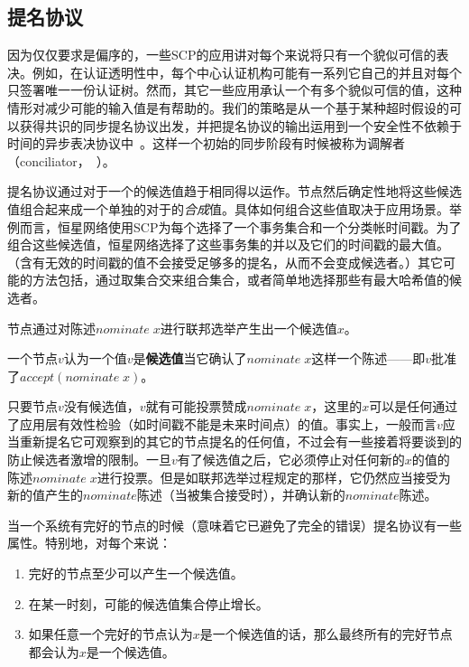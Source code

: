 \subsection{提名协议}

因为仅仅要求{\slot}是偏序的，一些SCP的应用讲对每个{\slot}来说将只有一个貌似可信的表决。例如，在认证透明性中，每个中心认证机构可能有一系列它自己的{\slot}并且对每个{\slot}只签署唯一一份认证树。然而，其它一些应用承认一个{\slot}有多个貌似可信的值，这种情形对减少可能的输入值是有帮助的。我们的策略是从一个基于某种超时假设的可以获得共识的同步提名协议出发，并把提名协议的输出运用到一个安全性不依赖于时间的异步表决协议中~\cite{Lamport:2011:BAL:2075029.2075043}。这样一个初始的同步阶段有时候被称为调解者（conciliator，~\cite{Aspnes:2010:MAS:1835698.1835802}）。

提名协议通过对于一个{\slot}的候选值趋于相同得以运作。节点然后确定性地将这些候选值组合起来成一个单独的对于{\slot}的\textit{合成}值。具体如何组合这些值取决于应用场景。举例而言，恒星网络使用SCP为每个{\slot}选择了一个事务集合和一个分类帐时间戳。为了组合这些候选值，恒星网络选择了这些事务集的并以及它们的时间戳的最大值。（含有无效的时间戳的值不会接受足够多的提名，从而不会变成候选者。）其它可能的方法包括，通过取集合交来组合集合，或者简单地选择那些有最大哈希值的候选者。

节点通过对陈述$nominate\;x$进行联邦选举产生出一个候选值$x$。

\begin{definition}[候选的]
	一个节点$v$认为一个值$v$是\textbf{候选值}当它确认了$nominate\;x$这样一个陈述——即$v$批准了$accept(nominate\;x)$。
\end{definition}

只要节点$v$没有候选值，$v$就有可能投票赞成$nominate\;x$，这里的$x$可以是任何通过了应用层有效性检验（如时间戳不能是未来时间点）的值。事实上，一般而言$v$应当重新提名它可观察到的其它的节点提名的任何值，不过会有一些接着将要谈到的防止候选者激增的限制。一旦$v$有了候选值之后，它必须停止对任何新的$x$的值的陈述$nominate\;x$进行投票。但是如联邦选举过程规定的那样，它仍然应当接受为新的值产生的$nominate$陈述（当被{\vblock}集合接受时），并确认新的$nominate$陈述。

当一个系统有完好的节点的时候（意味着它已避免了完全的错误）提名协议有一些属性。特别地，对每个{\slot}来说：
\begin{enumerate}
	\item\label{enum:cand_p1} 完好的节点至少可以产生一个候选值。
	\item\label{enum:cand_p2} 在某一时刻，可能的候选值集合停止增长。
	\item\label{enum:cand_p3} 如果任意一个完好的节点认为$x$是一个候选值的话，那么最终所有的完好节点都会认为$x$是一个候选值。
\end{enumerate}

